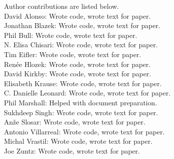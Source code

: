 Author contributions are listed below. \\
David Alonso: Wrote code, wrote text for paper. \\
Jonathan Blazek: Wrote code, wrote text for paper. \\
Phil Bull: Wrote code, wrote text for paper. \\
N. Elisa Chisari: Wrote code, wrote text for paper. \\
Tim Eifler: Wrote code, wrote text for paper. \\
Ren\'ee Hlozek: Wrote code, wrote text for paper. \\
David Kirkby: Wrote code, wrote text for paper. \\
Elisabeth Krause: Wrote code, wrote text for paper. \\
C. Danielle Leonard: Wrote code, wrote text for paper. \\
Phil Marshall: Helped with document preparation. \\
Sukhdeep Singh: Wrote code, wrote text for paper. \\
An\v{z}e Slosar: Wrote code, wrote text for paper. \\
Antonio Villarreal: Wrote code, wrote text for paper. \\
Michal Vrastil: Wrote code, wrote text for paper. \\
Joe Zuntz: Wrote code, wrote text for paper. \\
